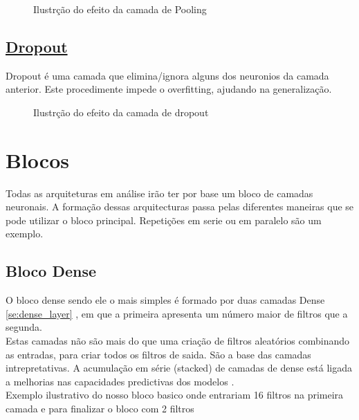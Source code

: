 \begin{figure}[H]
	\centering
	\resizebox{\linewidth}{!}{}
	\caption{Ilustrção do efeito da camada de Pooling}
	\label{fig:pooling}
\end{figure}



\subsection{\href{https://keras.io/api/layers/regularization_layers/dropout/}{Dropout}\label{se:dropout}}

Dropout é uma camada que elimina/ignora alguns dos neuronios da camada anterior. Este procedimente impede o overfitting, ajudando na generalização. \\

\begin{figure}[H]
	\centering
	\resizebox{\linewidth}{!}{}
	\caption{Ilustrção do efeito da camada de dropout}
	\label{fig:dropout}
\end{figure}



\section{Blocos\label{se:blocos}}

Todas as arquiteturas em análise irão ter por base um bloco de camadas neuronais. A formação dessas arquitecturas passa pelas diferentes maneiras que se pode utilizar o bloco principal. Repetições em serie ou em paralelo são um exemplo. \\

\subsection{Bloco Dense\label{se:dense}}

O bloco dense sendo ele o mais simples é formado por duas camadas Dense \ref{se:dense_layer} \cite{}, em que a primeira apresenta um número maior de filtros que a segunda. \\
Estas camadas não são mais do que uma criação de filtros aleatórios combinando as entradas, para criar todos os filtros de saida. São a base das camadas intrepretativas. A acumulação em série (stacked) de camadas de dense está ligada a melhorias nas capacidades predictivas dos modelos \cite{VLHelen2021}. \\
Exemplo ilustrativo do nosso bloco basico onde entrariam 16 filtros na primeira camada e para finalizar o bloco com 2 filtros \\




